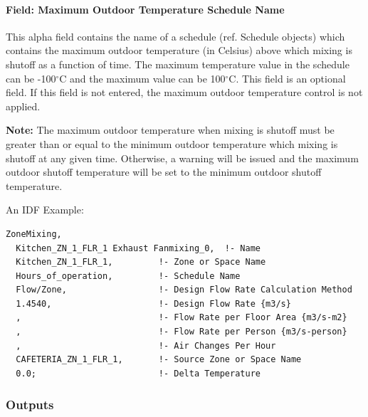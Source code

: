 \paragraph{Field: Maximum Outdoor Temperature Schedule Name}\label{field-maximum-outdoor-temperature-schedule-name-2}

This alpha field contains the name of a schedule (ref. Schedule objects) which contains the maximum outdoor temperature (in Celsius) above which mixing is shutoff as a function of time. The maximum temperature value in the schedule can be -100$^\circ$C and the maximum value can be 100$^\circ$C. This field is an optional field. If this field is not entered, the maximum outdoor temperature control is not applied.

\textbf{Note:} The maximum outdoor temperature when mixing is shutoff must be greater than or equal to the minimum outdoor temperature which mixing is shutoff at any given time. Otherwise, a warning will be issued and the maximum outdoor shutoff temperature will be set to the minimum outdoor shutoff temperature.

An IDF Example:

\begin{lstlisting}
ZoneMixing,
  Kitchen_ZN_1_FLR_1 Exhaust Fanmixing_0,  !- Name
  Kitchen_ZN_1_FLR_1,         !- Zone or Space Name
  Hours_of_operation,         !- Schedule Name
  Flow/Zone,                  !- Design Flow Rate Calculation Method
  1.4540,                     !- Design Flow Rate {m3/s}
  ,                           !- Flow Rate per Floor Area {m3/s-m2}
  ,                           !- Flow Rate per Person {m3/s-person}
  ,                           !- Air Changes Per Hour
  CAFETERIA_ZN_1_FLR_1,       !- Source Zone or Space Name
  0.0;                        !- Delta Temperature
\end{lstlisting}

\subsubsection{Outputs}\label{outputs-3-000}


